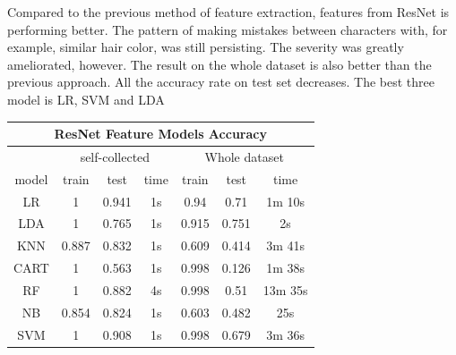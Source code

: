 \documentclass[11.5pt]{article}
\begin{document}
\begin{enumerate}
\begin{itemize}
            \vspace{3mm}
            \begin{minipage}{0.35\textwidth}
                Compared to the previous method of feature extraction, features from ResNet is performing better.
                The pattern of making mistakes between characters with, for example, similar hair color, was still persisting.
                The severity was greatly ameliorated, however.
                The result on the whole dataset is also better than the previous approach.
                All the accuracy rate on test set decreases.
                The best three model is LR, SVM and LDA
            \end{minipage}
            \begin{minipage}{0.5\textwidth}
                \begin{tabular}{|c|c|c|c|c|c|c|}
                    \multicolumn{7}{c}{\textbf{ResNet Feature Models Accuracy} }\\
                    \hline
                        & \multicolumn{3}{|c|}{self-collected} & \multicolumn{3}{|c|}{Whole dataset} \\ \hline
                    model & train & test & time & train & test & time \\ \hline
                    LR & 1 & 0.941 & 1s & 0.94 & 0.71 & 1m 10s \\ \hline
                    LDA  & 1 & 0.765 & 1s & 0.915 & 0.751 & 2s \\ \hline
                    KNN & 0.887 & 0.832 & 1s & 0.609 & 0.414 & 3m 41s \\ \hline
                    CART & 1 & 0.563 & 1s & 0.998 & 0.126 & 1m 38s \\ \hline
                    RF & 1 & 0.882 & 4s & 0.998 & 0.51 & 13m 35s\\ \hline
                    NB & 0.854 & 0.824 & 1s & 0.603 & 0.482 & 25s \\ \hline
                    SVM  & 1 & 0.908 & 1s & 0.998 & 0.679 & 3m 36s \\ \hline
                \end{tabular}
            \end{minipage}
            

\end{itemize}
\end{enumerate}
\end{document}
